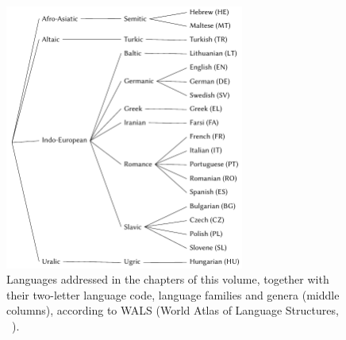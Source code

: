 \documentclass[output=paper,modfonts,]{langscibook}
\begin{document}
\begin{figure}
\includegraphics[width=0.70\textwidth]{figures/language-tree.pdf}
\caption{Languages addressed in the chapters of this volume, together with their two-letter language code, language families and genera (middle columns), according to WALS (World Atlas of Language Structures, ~\citealt{wals13}).}
\label{preface:fig:language-tree}
\end{figure}






\end{document}
